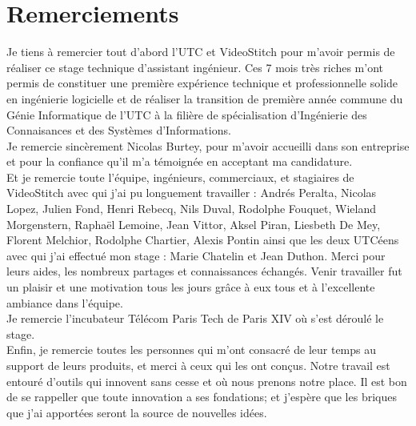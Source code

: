 \chapter*{Remerciements}
Je tiens à remercier tout d'abord l'UTC et VideoStitch pour m'avoir permis de réaliser ce stage technique d'assistant ingénieur. Ces 7 mois très riches m'ont permis de constituer une première expérience technique et professionnelle solide en ingénierie logicielle et de réaliser la transition de première année commune du Génie Informatique de l'UTC à la filière de spécialisation d'Ingénierie des Connaisances et des Systèmes d'Informations.
\\
\newline
Je remercie sincèrement Nicolas Burtey, pour m'avoir accueilli dans son entreprise et pour la confiance qu'il m'a témoignée en acceptant ma candidature.\\
Et je remercie toute l'équipe, ingénieurs, commerciaux, et stagiaires de VideoStitch avec qui j'ai pu longuement travailler : Andrés Peralta, Nicolas Lopez, Julien Fond, Henri Rebecq, Nils Duval, Rodolphe Fouquet, Wieland Morgenstern, Raphaël Lemoine, Jean Vittor, Aksel Piran, Liesbeth De Mey, Florent Melchior, Rodolphe Chartier, Alexis Pontin ainsi que les deux UTCéens avec qui j'ai effectué mon stage : Marie Chatelin et Jean Duthon. Merci pour leurs aides, les nombreux partages et connaissances échangés. Venir travailler fut un plaisir et une motivation tous les jours grâce à eux tous et à l'excellente ambiance dans l'équipe.
\\
\newline
Je remercie l'incubateur Télécom Paris Tech de Paris XIV où s'est déroulé le stage.
\\
\newline
Enfin, je remercie toutes les personnes qui m'ont consacré de leur temps au support de leurs produits, et merci à ceux qui les ont conçus. Notre travail est entouré d'outils qui innovent sans cesse et où nous prenons notre place. Il est bon de se rappeller que toute innovation a ses fondations; et j'espère que les briques que j'ai apportées seront la source de nouvelles idées.
